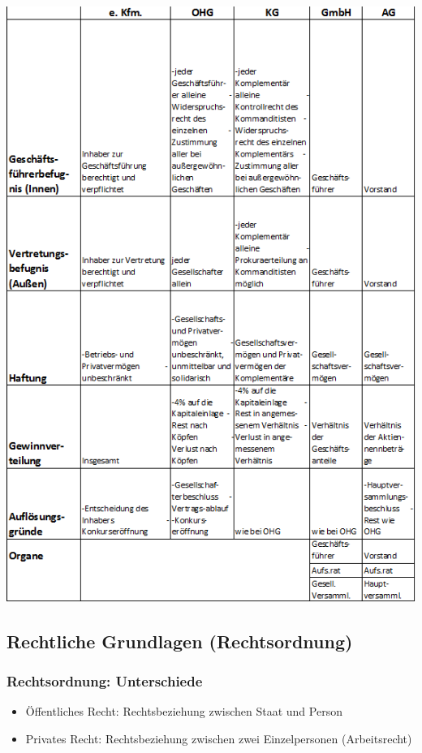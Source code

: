 	\includegraphics[scale=1.0]{pictures/lf01-pic/lf01-uebersicht_unternehmen_02.png}
	\newpage


\subsection{Rechtliche Grundlagen (Rechtsordnung)}

\subsubsection{Rechtsordnung: Unterschiede}
\begin{itemize}
	\item Öffentliches Recht: Rechtsbeziehung zwischen Staat und Person
	\item Privates Recht: Rechtsbeziehung zwischen zwei Einzelpersonen (Arbeitsrecht)
\end{itemize}
	
